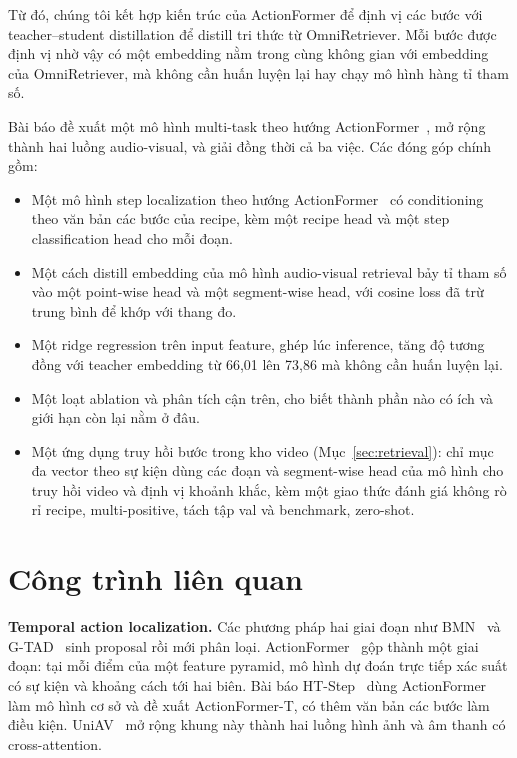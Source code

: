 \documentclass{IEEEtran}
\begin{document}
Từ đó, chúng tôi kết hợp kiến trúc của ActionFormer để định vị các bước với teacher--student distillation để distill tri thức từ OmniRetriever. Mỗi bước được định vị nhờ vậy có một embedding nằm trong cùng không gian với embedding của OmniRetriever, mà không cần huấn luyện lại hay chạy mô hình hàng tỉ tham số.

Bài báo đề xuất một mô hình multi-task theo hướng ActionFormer~\cite{actionformer}, mở rộng thành hai luồng audio-visual, và giải đồng thời cả ba việc. Các đóng góp chính gồm:
\begin{itemize}
\item Một mô hình step localization theo hướng ActionFormer~\cite{actionformer} có conditioning theo văn bản các bước của recipe, kèm một recipe head và một step classification head cho mỗi đoạn.
\item Một cách distill embedding của mô hình audio-visual retrieval bảy tỉ tham số vào một point-wise head và một segment-wise head, với cosine loss đã trừ trung bình để khớp với thang đo.
\item Một ridge regression trên input feature, ghép lúc inference, tăng độ tương đồng với teacher embedding từ 66,01 lên 73,86 mà không cần huấn luyện lại.
\item Một loạt ablation và phân tích cận trên, cho biết thành phần nào có ích và giới hạn còn lại nằm ở đâu.
\item Một ứng dụng truy hồi bước trong kho video (Mục~\ref{sec:retrieval}): chỉ mục đa vector theo sự kiện dùng các đoạn và segment-wise head của mô hình cho truy hồi video và định vị khoảnh khắc, kèm một giao thức đánh giá không rò rỉ recipe, multi-positive, tách tập val và benchmark, zero-shot.
\end{itemize}

\section{Công trình liên quan}
\textbf{Temporal action localization.} Các phương pháp hai giai đoạn như BMN~\cite{bmn} và G-TAD~\cite{gtad} sinh proposal rồi mới phân loại. ActionFormer~\cite{actionformer} gộp thành một giai đoạn: tại mỗi điểm của một feature pyramid, mô hình dự đoán trực tiếp xác suất có sự kiện và khoảng cách tới hai biên. Bài báo HT-Step~\cite{htstep} dùng ActionFormer làm mô hình cơ sở và đề xuất ActionFormer-T, có thêm văn bản các bước làm điều kiện. UniAV~\cite{uniav} mở rộng khung này thành hai luồng hình ảnh và âm thanh có cross-attention.
\end{document}
